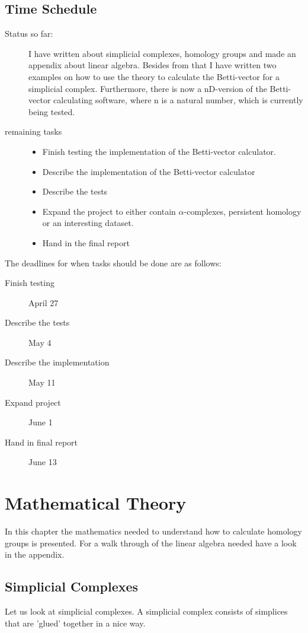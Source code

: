 \documentclass[11pt,a4paper,twoside]{report}
\begin{document}
\section{Time Schedule}
\begin{description}
\item[Status so far:] I have written about simplicial complexes, homology groups and made an appendix about linear algebra. Besides from that I have written two examples on how to use the theory to calculate the Betti-vector for a simplicial complex. Furthermore, there is now a nD-version of the Betti-vector calculating software, where n is a natural number, which is currently being tested. 
\item[remaining tasks]
\begin{itemize}
\item Finish testing the implementation of the Betti-vector calculator.
\item Describe the implementation of the Betti-vector calculator
\item Describe the tests
\item Expand the project to either contain $\alpha$-complexes, persistent homology or an interesting dataset.
\item Hand in the final report
\end{itemize}
\end{description}

The deadlines for when tasks should be done are as follows:
\begin{description}
\item[Finish testing]April 27
\item[Describe the tests]May 4
\item[Describe the implementation]May 11
\item[Expand project]June 1
\item[Hand in final report]June 13
\end{description}
\newpage

\chapter{Mathematical Theory}
In this chapter the mathematics needed to understand how to calculate homology groups is presented. For a walk through of the linear algebra needed have a look in the appendix.

\section{Simplicial Complexes}
Let us look at simplicial complexes. A simplicial complex consists of simplices that are 'glued' together in a nice way.
\end{document}
